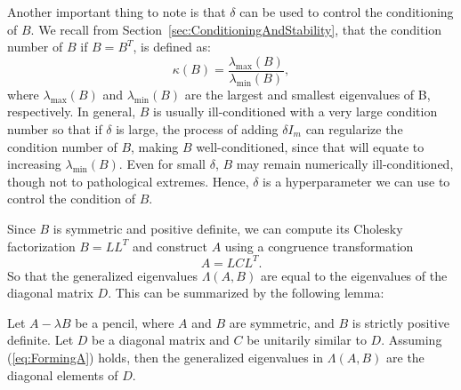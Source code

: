 Another important thing to note is that $\delta$ can be used to control the conditioning of $B$. We recall from Section~\ref{sec:ConditioningAndStability}, that the condition number of $B$ if $B=B^T$, is defined as:
\begin{equation}
	\kappa(B) = \frac{\lambda_{\max}(B)}{\lambda_{\min}(B)},
\end{equation}
where $\lambda_{\max}(B)$ and $\lambda_{\min}(B)$ are the largest and smallest eigenvalues of B, respectively.
In general, $B$ is usually ill-conditioned with a very large condition number so that if $\delta$ is large, the process of adding $\delta I_m$ can regularize the condition number of $B$, making $B$ well-conditioned, since that will equate to increasing $\lambda_{\min}(B)$. Even for small $\delta$, $B$ may remain numerically ill-conditioned, though not to pathological extremes. Hence, $\delta$ is a hyperparameter we can use to control the condition of $B$.

Since $B$ is symmetric and positive definite, we can compute its Cholesky factorization $B = LL^T$ and construct $A$ using a congruence transformation
\begin{equation}\label{eq:FormingA}
	A = LCL^T.
\end{equation}
So that the generalized eigenvalues $\Lambda(A, B)$ are equal to the eigenvalues of the diagonal matrix $D$. This can be summarized by the following lemma:
\begin{lemma}
  Let $A-\lambda B$ be a pencil, where $A$ and $B$ are symmetric, and $B$ is strictly positive definite. Let $D$ be a diagonal matrix and $C$ be unitarily similar to $D$. Assuming (\ref{eq:FormingA}) holds, then the  generalized eigenvalues in $\Lambda(A, B)$ are the diagonal elements of $D$.
\end{lemma}

